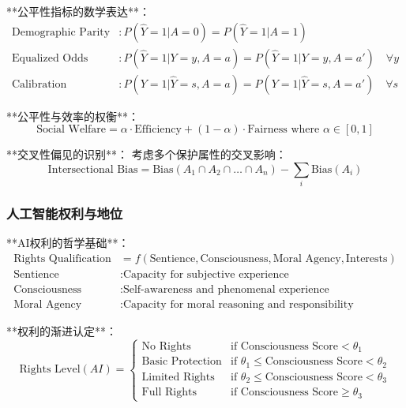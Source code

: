 **公平性指标的数学表达**：
\begin{align}
\text{Demographic Parity} &: P(\hat{Y}=1|A=0) = P(\hat{Y}=1|A=1) \\
\text{Equalized Odds} &: P(\hat{Y}=1|Y=y,A=a) = P(\hat{Y}=1|Y=y,A=a') \quad \forall y \\
\text{Calibration} &: P(Y=1|\hat{Y}=s,A=a) = P(Y=1|\hat{Y}=s,A=a') \quad \forall s
\end{align}

**公平性与效率的权衡**：
\begin{equation}
\text{Social Welfare} = \alpha \cdot \text{Efficiency} + (1-\alpha) \cdot \text{Fairness} \text{ where } \alpha \in [0,1]
\end{equation}

**交叉性偏见的识别**：
考虑多个保护属性的交叉影响：
\begin{equation}
\text{Intersectional Bias} = \text{Bias}(A_1 \cap A_2 \cap \ldots \cap A_n) - \sum_{i} \text{Bias}(A_i)
\end{equation}

\subsubsection{人工智能权利与地位} %

**AI权利的哲学基础**：
\begin{align}
\text{Rights Qualification} &= f(\text{Sentience}, \text{Consciousness}, \text{Moral Agency}, \text{Interests}) \\
\text{Sentience} &: \text{Capacity for subjective experience} \\
\text{Consciousness} &: \text{Self-awareness and phenomenal experience} \\
\text{Moral Agency} &: \text{Capacity for moral reasoning and responsibility}
\end{align}

**权利的渐进认定**：
\begin{equation}
\text{Rights Level}(AI) = \begin{cases}
\text{No Rights} & \text{if } \text{Consciousness Score} < \theta_1 \\
\text{Basic Protection} & \text{if } \theta_1 \leq \text{Consciousness Score} < \theta_2 \\
\text{Limited Rights} & \text{if } \theta_2 \leq \text{Consciousness Score} < \theta_3 \\
\text{Full Rights} & \text{if } \text{Consciousness Score} \geq \theta_3
\end{cases}
\end{equation}

